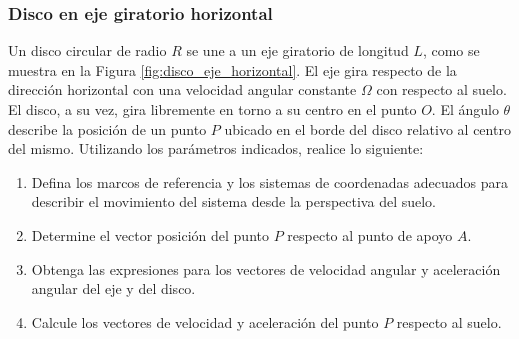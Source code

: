 \subsubsection{Disco en eje giratorio horizontal}

Un disco circular de radio $R$ se une a un eje giratorio de longitud $L$, como se muestra en la Figura \ref{fig:disco_eje_horizontal}. El eje gira respecto de la dirección horizontal con una velocidad angular constante $\Omega$ con respecto al suelo. El disco, a su vez, gira libremente en torno a su centro en el punto $O$. El ángulo $\theta$ describe la posición de un punto $P$ ubicado en el borde del disco relativo al centro del mismo. Utilizando los parámetros indicados, realice lo siguiente:

\begin{enumerate}
    \item Defina los marcos de referencia y los sistemas de coordenadas adecuados para describir el movimiento del sistema desde la perspectiva del suelo.
    \item Determine el vector posición del punto $P$ respecto al punto de apoyo $A$.
    \item Obtenga las expresiones para los vectores de velocidad angular y aceleración angular del eje y del disco.
    \item Calcule los vectores de velocidad y aceleración del punto $P$ respecto al suelo.
\end{enumerate}

